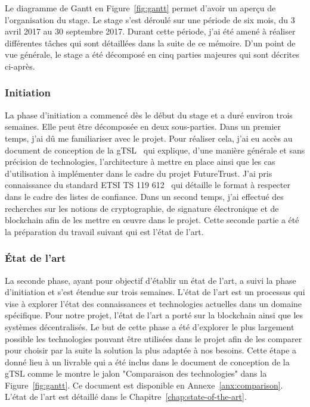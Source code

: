 \documentclass{tnreport}
\begin{document}
\clearpage

Le diagramme de Gantt en Figure~\ref{fig:gantt} permet d'avoir un aperçu de l'organisation du stage. Le stage s'est déroulé sur une période de six mois, du 3 avril 2017 au 30 septembre 2017. Durant cette période, j'ai été amené à réaliser différentes tâches qui sont détaillées dans la suite de ce mémoire. D'un point de vue générale, le stage a été décomposé en cinq parties majeures qui sont décrites ci-après.

\subsubsection{Initiation}

La phase d'initiation a commencé dès le début du stage et a duré environ trois semaines. 
Elle peut être décomposée en deux sous-parties. Dans un premier temps, j'ai dû me familiariser avec le projet. Pour réaliser cela, j'ai eu accès au document de conception de la gTSL~\cite{design-document} qui explique, d'une manière générale et sans précision de technologies, l'architecture à mettre en place ainsi que les cas d'utilisation à implémenter dans le cadre du projet FutureTrust. J'ai pris connaissance du standard ETSI TS 119 612~\cite{ETSITS119612} qui détaille le format à respecter dans le cadre des listes de confiance. Dans un second temps, j'ai effectué des recherches sur les notions de cryptographie, de signature électronique et de blockchain afin de les mettre en œuvre dans le projet. Cette seconde partie a été la préparation du travail suivant qui est l'état de l'art.

\subsubsection{État de l'art}

La seconde phase, ayant pour objectif d'établir un état de l'art, a suivi la phase d'initiation et s'est étendue sur trois semaines.
L'état de l'art est un processus qui vise à explorer l'état des connaissances et technologies actuelles dans un domaine spécifique. Pour notre projet, l'état de l'art a porté sur la blockchain ainsi que les systèmes  décentralisés. Le but de cette phase a été d'explorer le plus largement possible les technologies pouvant être utilisées dans le projet afin de les comparer pour choisir par la suite la solution la plus adaptée à nos besoins. Cette étape a donné lieu à un livrable qui a été inclus dans le document de conception de la gTSL comme le montre le jalon "Comparaison des technologies" dans la Figure~\ref{fig:gantt}. Ce document est disponible en Annexe~\ref{anx:comparison}. L'état de l'art est détaillé dans le Chapitre~\ref{chap:state-of-the-art}.
\end{document}
